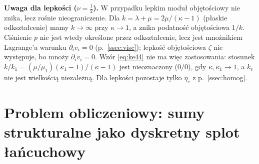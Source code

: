 \documentclass[12pt,a4paper,twoside,openright]{report}
\theoremstyle{definition}
\theoremstyle{remark}
\newcommand{\ziel}[1]{{\color{green!50!black}#1}}
\begin{document}
\textbf{Uwaga dla lepkości ($\nu=\tfrac12$).} W przypadku lepkim moduł objętościowy nie znika, lecz rośnie nieograniczenie. Dla $k=\lambda+\mu=2\mu/(\kappa-1)$ (płaskie odkształcenie) mamy $k\to\infty$ przy $\kappa\to1$, a znika podatność objętościowa $1/k$. Ciśnienie $p$ nie jest wtedy określone przez odkształcenie, lecz jest mnożnikiem Lagrange'a warunku $\partial_iv_i=0$ (p.~\ref{ssec:visc}); lepkość objętościowa $\zeta$ \cite{landau1987fluid} nie występuje, bo mnoży $\partial_iv_i=0$. Wzór \eqref{eq:ke44} nie ma więc zastosowania: stosunek $k/k_1=(\mu/\mu_1)(\kappa_1-1)/(\kappa-1)$ jest nieoznaczony ($0/0$), gdy $\kappa,\kappa_1\to1$, a $k_e$ nie jest wielkością niezależną. Dla lepkości pozostaje tylko $\eta_e$ z p.~\ref{ssec:homog}.

\chapter{\texorpdfstring{\ziel{Problem obliczeniowy: sumy strukturalne jako dyskretny splot łańcuchowy}}{Problem obliczeniowy: sumy strukturalne jako dyskretny splot łańcuchowy}}\label{sec:splot}
\end{document}
